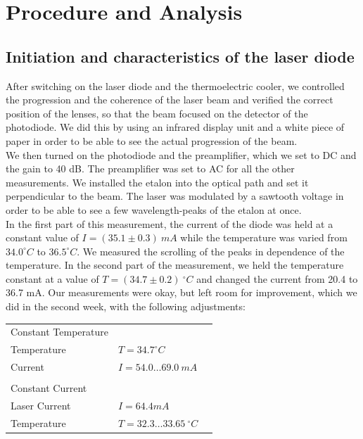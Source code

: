 \section{Procedure and Analysis}

\subsection{Initiation and characteristics of the laser diode}

After switching on the laser diode and the thermoelectric cooler, we controlled the progression and the coherence of the laser beam and verified the correct position of the lenses, so that the beam focused on the detector of the photodiode. We did this by using an infrared display unit and a white piece of paper in order to be able to see the actual progression of the beam.\\

We then turned on the photodiode and the preamplifier, which we set to DC and the gain to 40 dB. The preamplifier was set to AC for all the other measurements. We installed the etalon into the optical path and set it perpendicular to the beam. The laser was modulated by a sawtooth voltage in order to be able to see a few wavelength-peaks of the etalon at once.\\

In the first part of this measurement, the current of the diode was held at a constant value of $I = (35.1\pm 0.3)\ mA$ while the temperature was varied from $34.0^\circ C$ to $36.5^\circ C$. We measured the scrolling of the peaks in dependence of the temperature.
In the second part of the measurement, we held the temperature constant at a value of $T=(34.7 \pm 0.2)\ ^\circ C$ and changed the current from 20.4 to 36.7 mA.
Our measurements were okay, but left room for improvement, which we did in the second week, with the following adjustments:\\

\begin{center}
\begin{tabular}[H]{l l c}
Constant Temperature & \\
Temperature & $T=34.7 ^\circ C$\\
Current & $I = 54.0 \dots 69.0\ mA$\\
 & \\
Constant Current & \\
Laser Current & $I = 64.4 mA$\\
Temperature & $T=32.3 \dots 33.65\ ^\circ C$\\
\end{tabular}
\end{center}

